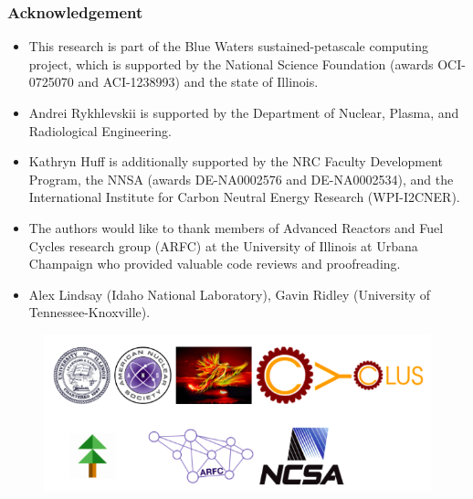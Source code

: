 \begin{frame}
  \frametitle{Acknowledgement}
  \begin{itemize}
    \item This research is part of the Blue Waters sustained-petascale computing project, 
which is supported by the National Science Foundation (awards OCI-0725070 and 
ACI-1238993) and the state of Illinois.
    \item Andrei Rykhlevskii is supported by the Department of Nuclear, Plasma, and Radiological Engineering.
    \item Kathryn Huff is additionally supported by the NRC Faculty Development Program, the NNSA (awards 
    DE-NA0002576 and DE-NA0002534), and the International Institute for Carbon Neutral Energy Research (WPI-I2CNER).
    \item The authors would like to thank  members of Advanced Reactors and Fuel Cycles
research group (ARFC) at the University of Illinois at Urbana Champaign who 
provided valuable code reviews and proofreading.
    \item Alex Lindsay (Idaho National Laboratory), Gavin Ridley (University of Tennessee-Knoxville).
  \end{itemize}
    \begin{figure}[t]
   \hspace*{-0.4in}
   \includegraphics[height=0.25\textheight]{./images/acks.png}
    \end{figure}
\end{frame}
